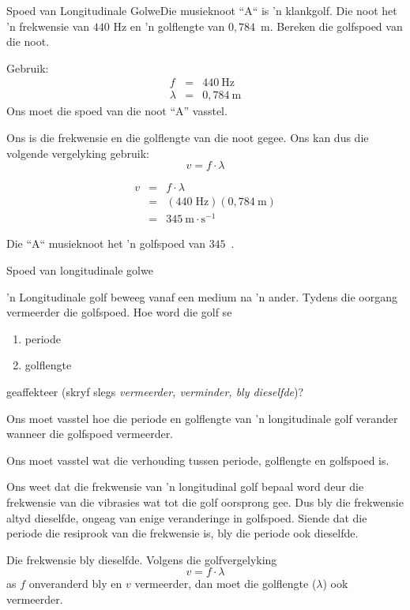 \begin{wex}
{Spoed van Longitudinale Golwe}{Die musieknoot ``A`` is 'n klankgolf. Die noot het 'n frekwensie van $440$ Hz en 'n golflengte van $0,784$~m. Bereken die golfspoed van die noot.}{
Gebruik:
\begin{eqnarray*}
f &=& 440 \ \text{Hz} \\
\lambda &=& 0,784\ \text{m}
\end{eqnarray*}
Ons moet die spoed van die noot ``A'' vasstel.

Ons is die frekwensie en die golflengte van die noot gegee. Ons kan dus die volgende vergelyking gebruik:
\begin{equation*}
v=f\cdot \lambda 
\end{equation*}

\begin{eqnarray*}
v&=&f\cdot \lambda\\
&=&(440\;\text{Hz})(0,784~\text{m})\\
&=&345~\text{m}\cdot\text{s}^{-1}
\end{eqnarray*}

Die ``A`` musieknoot het 'n golfspoed van $345$~\ms.
}
\end{wex}

\begin{wex}
{Spoed van longitudinale golwe}{\begin{minipage}{.85\textwidth} 'n Longitudinale golf beweeg vanaf een medium na 'n ander. Tydens die oorgang vermeerder die golfspoed. Hoe word die golf se  
\begin{enumerate}[noitemsep, label=\textbf{\arabic*}. ]
\item periode
\item golflengte
\end{enumerate}
geaffekteer (skryf slegs \emph{vermeerder, verminder, bly dieselfde})?
 \end{minipage}}{
Ons moet vasstel hoe die periode en golflengte van 'n longitudinale golf verander wanneer die golfspoed vermeerder.

Ons moet vasstel wat die verhouding tussen periode, golflengte en golfspoed is.

Ons weet dat die frekwensie van 'n longitudinal golf bepaal word deur die frekwensie van die vibrasies wat tot die golf oorsprong gee. Dus bly die frekwensie altyd dieselfde, ongeag van enige veranderinge in golfspoed. Siende dat die periode die resiprook van die frekwensie is, bly die periode ook dieselfde.

Die frekwensie bly dieselfde. Volgens die golfvergelyking
\begin{equation*}
v = f\cdot\lambda
\end{equation*}
as $f$ onveranderd bly en $v$ vermeerder, dan moet die golflengte ($\lambda$) ook vermeerder.
}
\end{wex}

